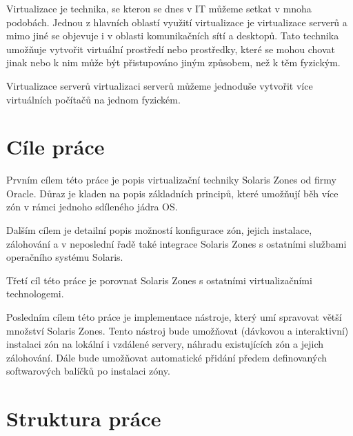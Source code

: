 Virtualizace je technika, se kterou se dnes v IT můžeme setkat v mnoha podobách. Jednou z hlavních oblastí využití virtualizace je virtualizace serverů a mimo jiné se objevuje i v oblasti
komunikačních sítí a desktopů. Tato technika umožňuje vytvořit virtuální prostředí nebo prostředky, které se mohou chovat jinak nebo k nim může být přistupováno jiným způsobem, než
k těm fyzickým. 

Virtualizace serverů  virtualizaci serverů můžeme jednoduše vytvořit více virtuálních počítačů na jednom fyzickém.
\section{Cíle práce}

Prvním cílem této práce je popis virtualizační techniky Solaris Zones od firmy Oracle. Důraz je kladen na popis základních principů, které umožňují běh více zón v rámci jednoho
sdíleného jádra OS.

Dalším cílem je detailní popis možností konfigurace zón, jejich instalace, zálohování a v neposlední řadě také integrace Solaris Zones s ostatními službami operačního systému
Solaris.

Třetí cíl této práce je porovnat Solaris Zones s ostatními virtualizačními technologemi.

Posledním cílem této práce je implementace nástroje, který umí spravovat větší množství Solaris Zones. Tento nástroj bude umožňovat (dávkovou a interaktivní) instalaci zón na
lokální i vzdálené servery, náhradu existujících zón a jejich zálohování. Dále bude umožňovat automatické přidání předem definovaných softwarových balíčků po instalaci zóny.

\section{Struktura práce}


